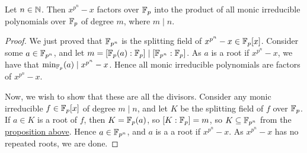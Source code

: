 \begin{proposition}
    Let \(n \in \mathbb{N}\).
    Then \(x^{p^n} - x\) factors over \(\mathbb{F}_p\)
    into the product of all monic irreducible polynomials over \(\mathbb{F}_p\)
    of degree \(m\), where \(m \mid n\).
\end{proposition}
\begin{proof}
    We just proved that \(\mathbb{F}_{p^n}\) is the splitting field of \(x^{p^n} - x \in \mathbb{F}_p[x]\).
    Consider some \(a \in \mathbb{F}_{p^n}\), and let \(m = [\mathbb{F}_p(a):\mathbb{F}_p] \mid [\mathbb{F}_{p^n}:\mathbb{F}_p]\).
    As \(a\) is a root if \(x^{p^n} - x\), we have that \(\min_{\mathbb{F}_p}(a) \mid x^{p^n} - x\).
    Hence all monic irreducible polynomials are factors of \(x^{p^n} - x\).

    Now, we wish to show that these are all the divisors.
    Consider any monic irreducible \(f \in \mathbb{F}_p[x]\) of degree \(m \mid n\),
    and let \(K\) be the splitting field of \(f\) over \(\mathbb{F}_p\).
    If \(a \in K\) is a root of \(f\), then \(K = \mathbb{F}_p(a)\), so \([K:\mathbb{F}_p] = m\),
    so \(K \subseteq \mathbb{F}_{p^n}\) from the \hyperref[prop:finite-field-size-inclusion]{proposition above}.
    Hence \(a \in \mathbb{F}_{p^n}\), and \(a\) is a a root if \(x^{p^n} - x\).
    As \(x^{p^n} - x\) has no repeated roots, we are done.
\end{proof}


